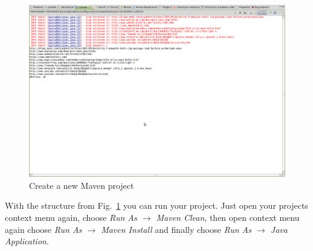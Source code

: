 \documentclass[a4paper,twoside]{book}      %
\begin{document}
\begin{figure}
\centering
\includegraphics[width=\textwidth]{img/ht14.png}
\caption{Create a new Maven project}
\label{fig:structure}
\end{figure}
With the structure from Fig.~\ref{fig:structure} you can run your project. Just open your projects context menu again, choose \textit{Run As $\rightarrow$ Maven Clean}, then open context menu again choose \textit{Run As $\rightarrow$ Maven Install} and finally choose \textit{Run As $\rightarrow$ Java Application}.
\end{document}
